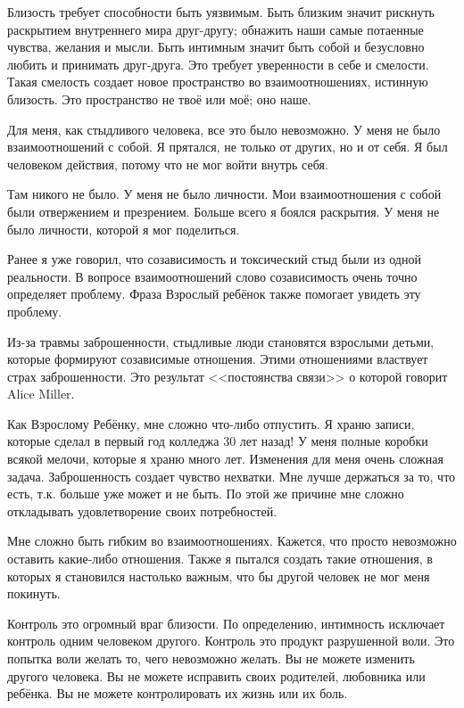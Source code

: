 \documentclass[10pt, fleqn]{article}
\begin{document}
Близость требует способности быть уязвимым. Быть близким значит рискнуть раскрытием внутреннего мира друг-другу; обнажить наши самые потаенные чувства, желания и мысли. Быть интимным значит быть собой и безусловно любить и принимать друг-друга. Это требует уверенности в себе и смелости. Такая смелость создает новое пространство во взаимоотношениях, истинную близость. Это пространство не твоё или моё; оно наше.

Для меня, как стыдливого человека, все это было невозможно. У меня не было взаимоотношений с собой. Я прятался, не только от других, но и от себя. Я был человеком действия, потому что не мог войти внутрь себя.

Там никого не было. У меня не было личности. Мои взаимоотношения с собой были отвержением и презрением. Больше всего я боялся раскрытия. У меня не было личности, которой я мог поделиться.


Ранее я уже говорил, что созависимость и токсический стыд были из одной реальности. В вопросе взаимоотношений слово созависимость очень точно определяет проблему. Фраза Взрослый ребёнок также помогает увидеть эту проблему.


Из-за травмы заброшенности, стыдливые люди становятся взрослыми детьми, которые формируют созависимые отношения. Этими отношениями властвует страх заброшенности. Это результат <<постоянства связи>> о которой говорит Alice Miller.

Как Взрослому Ребёнку, мне сложно что-либо отпустить. Я храню записи, которые сделал в первый год колледжа 30 лет назад! У меня полные коробки всякой мелочи, которые я храню много лет. Изменения для меня очень сложная задача. Заброшенность создает чувство нехватки. Мне лучше держаться за то, что есть, т.к. больше уже может и не быть. По этой же причине мне сложно откладывать удовлетворение своих потребностей.

Мне сложно быть гибким во взаимоотношениях. Кажется, что просто невозможно оставить какие-либо отношения. Также я пытался создать такие отношения, в которых я становился настолько важным, что бы другой человек не мог меня покинуть.


Контроль это огромный враг близости. По определению, интимность исключает контроль одним человеком другого. Контроль это продукт разрушенной воли. Это попытка воли желать то, чего невозможно желать. Вы не можете изменить другого человека. Вы не можете исправить своих родителей, любовника или ребёнка. Вы не можете контролировать их жизнь или их боль.
\end{document}
